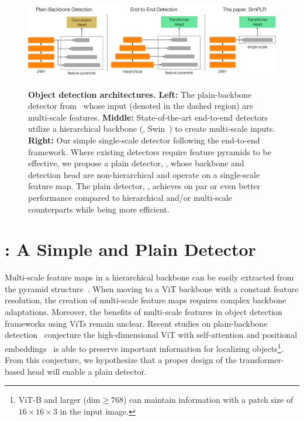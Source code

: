 \begin{figure}[t]
    \centering
    \includegraphics[width=\linewidth]{fig/compare1.pdf}\\
    \caption{
    \textbf{Object detection architectures. Left:} The plain-backbone detector from~\cite{li2022vitdet} whose input (denoted in the dashed region) are multi-scale features. \textbf{Middle:} State-of-the-art end-to-end detectors~\cite{nguyen2022boxer,cheng2022mask2former} utilize a hierarchical backbone (\ie, Swin~\cite{liu2021swintransformer}) to create multi-scale inputs. \textbf{Right:} Our simple single-scale detector following the end-to-end framework. Where existing detectors require feature pyramids to be effective, we propose a plain detector, \ours, whose backbone and detection head are non-hierarchical and operate on a single-scale feature map. The plain detector, \ours, achieves on par or even better performance compared to hierarchical and/or multi-scale counterparts while being more efficient.
    }\label{fig:compare}
\end{figure}

\section{\ours: A Simple and Plain Detector}
\label{sec:simplr}

Multi-scale feature maps in a hierarchical backbone can be easily extracted from the pyramid structure~\cite{wei2016ssd,tsung2017fpn,zhu2021deformable}. When moving to a ViT backbone with a constant feature resolution, the creation of multi-scale feature maps requires complex backbone adaptations. Moreover, the benefits of multi-scale features in object detection frameworks using ViTs remain unclear. Recent studies on plain-backbone detection~\cite{li2022vitdet,chen2022uvit} conjecture the high-dimensional ViT with self-attention and positional embeddings~\cite{vaswani2017transformer} is able to preserve important information for localizing objects\footnote{ViT-B and larger ($\text{dim}\ge768$) can maintain information with a patch size of $16{\times}16{\times}3$ in the input image.}. From this conjecture, we hypothesize that a proper design of the transformer-based head will enable a plain detector.

